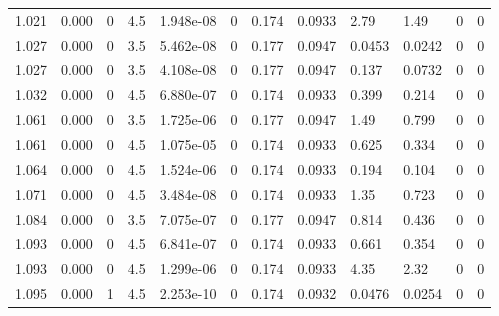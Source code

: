\documentclass[preview]{standalone}
\begin{document}
{{{\begin{tabular}{L{1.2cm}C{1.2cm} C{0.3cm}C{0.5cm} C{1.4cm}C{1.4cm} C{1.4cm}C{1.4cm} C{1.6cm}C{1.6cm} C{1.6cm}C{1.6cm}}
  1.021  &  0.000  & 0     & 4.5 &  1.948e-08  & 0  &  0.174&   0.0933& 2.79 & 1.49   &  0 & 0  \\ 
  1.027  &  0.000  & 0     & 3.5 &  5.462e-08  & 0  &  0.177&   0.0947& 0.0453 & 0.0242   &  0 & 0  \\ 
  1.027  &  0.000  & 0     & 3.5 &  4.108e-08  & 0  &  0.177&   0.0947& 0.137 & 0.0732   &  0 & 0  \\ 
  1.032  &  0.000  & 0     & 4.5 &  6.880e-07  & 0  &  0.174&   0.0933& 0.399 & 0.214   &  0 & 0  \\ 
  1.061  &  0.000  & 0     & 3.5 &  1.725e-06  & 0  &  0.177&   0.0947& 1.49 & 0.799   &  0 & 0  \\ 
  1.061  &  0.000  & 0     & 4.5 &  1.075e-05  & 0  &  0.174&   0.0933& 0.625 & 0.334   &  0 & 0  \\ 
  1.064  &  0.000  & 0     & 4.5 &  1.524e-06  & 0  &  0.174&   0.0933& 0.194 & 0.104   &  0 & 0  \\ 
  1.071  &  0.000  & 0     & 4.5 &  3.484e-08  & 0  &  0.174&   0.0933& 1.35 & 0.723   &  0 & 0  \\ 
  1.084  &  0.000  & 0     & 3.5 &  7.075e-07  & 0  &  0.177&   0.0947& 0.814 & 0.436   &  0 & 0  \\ 
  1.093  &  0.000  & 0     & 4.5 &  6.841e-07  & 0  &  0.174&   0.0933& 0.661 & 0.354   &  0 & 0  \\ 
  1.093  &  0.000  & 0     & 4.5 &  1.299e-06  & 0  &  0.174&   0.0933& 4.35 & 2.32   &  0 & 0  \\ 
  1.095  &  0.000  & 1     & 4.5 &  2.253e-10  & 0  &  0.174&   0.0932& 0.0476 & 0.0254   &  0 & 0  \\ 
\hline 
\end{tabular} 

}}}
\end{document}
